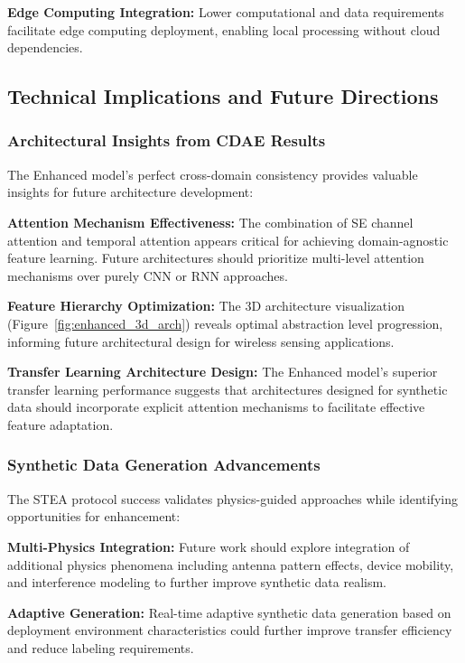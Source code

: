 \textbf{Edge Computing Integration:} Lower computational and data requirements facilitate edge computing deployment, enabling local processing without cloud dependencies.

\subsection{Technical Implications and Future Directions}

\subsubsection{Architectural Insights from CDAE Results}

The Enhanced model's perfect cross-domain consistency provides valuable insights for future architecture development:

\textbf{Attention Mechanism Effectiveness:} The combination of SE channel attention and temporal attention appears critical for achieving domain-agnostic feature learning. Future architectures should prioritize multi-level attention mechanisms over purely CNN or RNN approaches.

\textbf{Feature Hierarchy Optimization:} The 3D architecture visualization (Figure~\ref{fig:enhanced_3d_arch}) reveals optimal abstraction level progression, informing future architectural design for wireless sensing applications.

\textbf{Transfer Learning Architecture Design:} The Enhanced model's superior transfer learning performance suggests that architectures designed for synthetic data should incorporate explicit attention mechanisms to facilitate effective feature adaptation.

\subsubsection{Synthetic Data Generation Advancements}

The STEA protocol success validates physics-guided approaches while identifying opportunities for enhancement:

\textbf{Multi-Physics Integration:} Future work should explore integration of additional physics phenomena including antenna pattern effects, device mobility, and interference modeling to further improve synthetic data realism.

\textbf{Adaptive Generation:} Real-time adaptive synthetic data generation based on deployment environment characteristics could further improve transfer efficiency and reduce labeling requirements.

